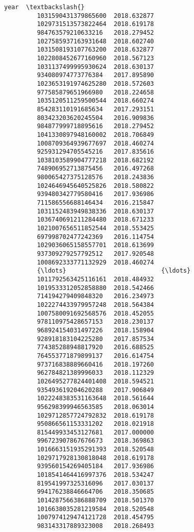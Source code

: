 \documentclass[11pt]{article}
\begin{document}
\begin{Verbatim}[commandchars=\\\{\}]
                                     year  \textbackslash{}
         1031590431379865600  2018.632877   
         1029731513573822464  2018.619178   
         984763579210633216   2018.279452   
         1027585937163931648  2018.602740   
         1031508193107763200  2018.632877   
         1022808452677160960  2018.567123   
         1031137499995930624  2018.630137   
         934080974773776384   2017.895890   
         1023653191974625280  2018.572603   
         977585879651966980   2018.224658   
         1035120511259500544  2018.660274   
         854283110191685634   2017.293151   
         803423203620245504   2016.909836   
         984877999718895616   2018.279452   
         1041330897948160002  2018.706849   
         1008709364939677697  2018.460274   
         925931294705545216   2017.835616   
         1038103589904777218  2018.682192   
         748906952713875456   2016.497268   
         980065427375128576   2018.243836   
         1024646945640525826  2018.580822   
         939480342779580416   2017.936986   
         711586556688146434   2016.215847   
         1031152483949838336  2018.630137   
         1036740691211284480  2018.671233   
         1021007656511852544  2018.553425   
         697998702477242369   2016.114754   
         1029036065158557701  2018.613699   
         937309279257792512   2017.920548   
         1008692333771132929  2018.460274   
         {\ldots}                          {\ldots}   
         1011792563425116161  2018.484932   
         1019533312052858880  2018.542466   
         714194279409848320   2016.234973   
         1022274433979957248  2018.564384   
         1007580091692568576  2018.452055   
         978110975428657153   2018.230137   
         968924154031497226   2018.158904   
         928918183104225280   2017.857534   
         774385288948817920   2016.688525   
         764553771879899137   2016.614754   
         973716838889660416   2018.197260   
         962784821389996033   2018.112329   
         1026495277824401408  2018.594521   
         935493619204620288   2017.906849   
         1022248383531163648  2018.561644   
         956298399946563585   2018.063014   
         1029712857724792832  2018.619178   
         950866561153331202   2018.021918   
         815449933453127681   2017.000000   
         996723907867676673   2018.369863   
         1016663151935291393  2018.520548   
         1029717928130818048  2018.619178   
         939560154269405184   2017.936986   
         1018541464416997376  2018.534247   
         819541997325316096   2017.030137   
         994176238846664706   2018.350685   
         1014287566386888709  2018.501370   
         1016638035281219584  2018.520548   
         1007974129474121728  2018.454795   
         983143317889323008   2018.268493   
         

\end{Verbatim}
\end{document}

